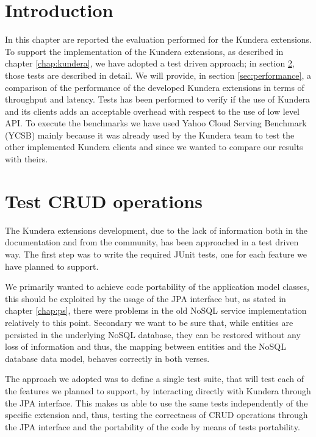 \section{Introduction}
In this chapter are reported the evaluation performed for the Kundera extensions.
To support the implementation of the Kundera extensions, as described in chapter \ref{chap:kundera}, we have adopted a test driven approach; in section \ref{sec:crud}, those tests are described in detail.
\noindent We will provide, in section \ref{sec:performance}, a comparison of the performance of the developed Kundera extensions in terms of throughput and latency. Tests has been performed to verify if the use of Kundera and its clients adds an acceptable overhead with respect to the use of low level API.
To execute the benchmarks we have used Yahoo Cloud Serving Benchmark (YCSB) \cite{paper:ycsb} mainly because it was already used by the Kundera team to test the other implemented Kundera clients and since we wanted to compare our results with theirs.

\section{Test CRUD operations}
\label{sec:crud}
The Kundera extensions development, due to the lack of information both in the documentation and from the community, has been approached in a test driven way.
The first step was to write the required JUnit tests, one for each feature we have planned to support.

\newparagraph We primarily wanted to achieve code portability of the application model classes, this should be exploited by the usage of the JPA interface but, as stated in chapter \ref{chap:ps}, there were problems in the old NoSQL service implementation relatively to this point.
Secondary we want to be sure that, while entities are persisted in the underlying NoSQL database, they can be restored without any loss of information and thus, the mapping between entities and the NoSQL database data model, behaves correctly in both verses.

\noindent The approach we adopted was to define a single test suite, that will test each  of the features we planned to support, by interacting directly with Kundera through the JPA interface. This makes us able to use the same tests independently of the specific extension and, thus, testing the correctness of CRUD operations through the JPA interface and the portability of the code by means of tests portability.

